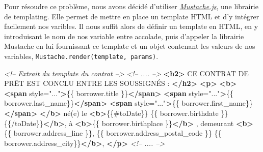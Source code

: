 \documentclass[12pt,a4paper]{article}
\newenvironment{Shaded}{}{}
\newcommand{\KeywordTok}[1]{\textcolor[rgb]{0.00,0.44,0.13}{\textbf{{#1}}}}
\newcommand{\StringTok}[1]{\textcolor[rgb]{0.25,0.44,0.63}{{#1}}}
\newcommand{\CommentTok}[1]{\textcolor[rgb]{0.38,0.63,0.69}{\textit{{#1}}}}
\newcommand{\OtherTok}[1]{\textcolor[rgb]{0.00,0.44,0.13}{{#1}}}
\newcommand{\NormalTok}[1]{{#1}}
\begin{document}
  \bigskip

  Pour résoudre ce problème, nous avons décidé d'utiliser
  \href{https://github.com/janl/mustache.js}{\emph{Mustache.js}}, une
  librairie de templating. Elle permet de mettre en place un template HTML
  et d'y intégrer facilement nos varibles. Il nous suffit alors de définir
  un template en HTML, en y introduisant le nom de nos variable entre
  accolade, puis d'appeler la librairie Mustache en lui fournissant ce
  template et un objet contenant les valeurs de nos variables,
  \texttt{Mustache.render(template,\ params)}.

  \begin{Shaded}
  \begin{Highlighting}[]
  \CommentTok{<!-- Extrait du template du contrat -->}
  \CommentTok{<!-- .... -->}
  \KeywordTok{<h2>}
    \NormalTok{CE CONTRAT DE PRÊT EST CONCLU ENTRE LES SOUSSIGNÉS :}
  \KeywordTok{</h2>}
  \KeywordTok{<p>}
    \KeywordTok{<b>}
      \KeywordTok{<span}\OtherTok{ style=}\StringTok{"..."}\KeywordTok{>}\NormalTok{\{\{ borrower.title \}\}}\KeywordTok{</span>}
      \KeywordTok{<span}\OtherTok{ style=}\StringTok{"..."}\KeywordTok{>}\NormalTok{\{\{ borrower.last_name\}\}}\KeywordTok{</span>}
      \KeywordTok{<span}\OtherTok{ style=}\StringTok{"..."}\KeywordTok{>}\NormalTok{\{\{ borrower.first_name\}\}}\KeywordTok{</span>}
    \KeywordTok{</b>}
    \NormalTok{né(e) le}
    \KeywordTok{<b>}\NormalTok{\{\{#toDate\}\} \{\{ borrower.birthdate \}\} \{\{/toDate\}\}}\KeywordTok{</b>}\NormalTok{,}
    \NormalTok{à}
    \KeywordTok{<b>}\NormalTok{\{\{ borrower.birthplace \}\}}\KeywordTok{</b>}
    \NormalTok{, demeurant}
    \KeywordTok{<b>}
      \NormalTok{\{\{ borrower.address_line \}\},}
      \NormalTok{\{\{ borrower.address_postal_code \}\}}
      \NormalTok{\{\{ borrower.address_city\}\}}\KeywordTok{</b>}\NormalTok{,}
  \KeywordTok{</p>}
  \CommentTok{<!-- .... -->}
  \end{Highlighting}
  \end{Shaded}
\end{document}
